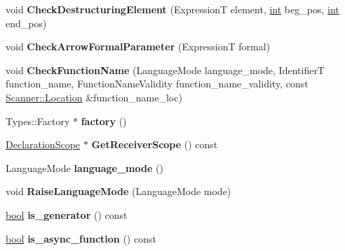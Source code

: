\begin{DoxyCompactItemize}
void {\bfseries Check\+Destructuring\+Element} (ExpressionT element, \mbox{\hyperlink{classint}{int}} beg\+\_\+pos, \mbox{\hyperlink{classint}{int}} end\+\_\+pos)
\item 
\mbox{\label{classv8_1_1internal_1_1ParserBase_aa9d2dca9bde7d19141debc46c4d2797c}} 
void {\bfseries Check\+Arrow\+Formal\+Parameter} (ExpressionT formal)
\item 
\mbox{\label{classv8_1_1internal_1_1ParserBase_a3e23cf98760884cddc2132e4fbf2fc4f}} 
void {\bfseries Check\+Function\+Name} (Language\+Mode language\+\_\+mode, IdentifierT function\+\_\+name, Function\+Name\+Validity function\+\_\+name\+\_\+validity, const \mbox{\hyperlink{structv8_1_1internal_1_1Scanner_1_1Location}{Scanner\+::\+Location}} \&function\+\_\+name\+\_\+loc)
\item 
\mbox{\label{classv8_1_1internal_1_1ParserBase_a4ff80a80021b1dd42b5af256ccc3b410}} 
Types\+::\+Factory $\ast$ {\bfseries factory} ()
\item 
\mbox{\label{classv8_1_1internal_1_1ParserBase_af8a0540b6d1d9892b53c369795680cb6}} 
\mbox{\hyperlink{classv8_1_1internal_1_1DeclarationScope}{Declaration\+Scope}} $\ast$ {\bfseries Get\+Receiver\+Scope} () const
\item 
\mbox{\label{classv8_1_1internal_1_1ParserBase_af42860cf3329543adc0c28d092cf92a4}} 
Language\+Mode {\bfseries language\+\_\+mode} ()
\item 
\mbox{\label{classv8_1_1internal_1_1ParserBase_ac5c945e9f01367b76dcd5d6cb94eee69}} 
void {\bfseries Raise\+Language\+Mode} (Language\+Mode mode)
\item 
\mbox{\label{classv8_1_1internal_1_1ParserBase_a0696fa7dfc061ad5231f93be342c9739}} 
\mbox{\hyperlink{classbool}{bool}} {\bfseries is\+\_\+generator} () const
\item 
\mbox{\label{classv8_1_1internal_1_1ParserBase_a9366cdcca00ddbe076c6c4fadfe65e53}} 
\mbox{\hyperlink{classbool}{bool}} {\bfseries is\+\_\+async\+\_\+function} () const

\end{DoxyCompactItemize}
